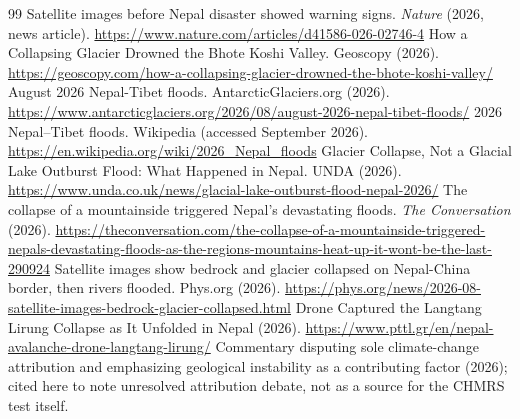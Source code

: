 \documentclass[11pt,twocolumn]{article}
\begin{document}
\begin{thebibliography}{99}
 Satellite images before Nepal disaster showed warning signs. \textit{Nature} (2026, news article). \url{https://www.nature.com/articles/d41586-026-02746-4}
 How a Collapsing Glacier Drowned the Bhote Koshi Valley. Geoscopy (2026). \url{https://geoscopy.com/how-a-collapsing-glacier-drowned-the-bhote-koshi-valley/}
 August 2026 Nepal-Tibet floods. AntarcticGlaciers.org (2026). \url{https://www.antarcticglaciers.org/2026/08/august-2026-nepal-tibet-floods/}
 2026 Nepal--Tibet floods. Wikipedia (accessed September 2026). \url{https://en.wikipedia.org/wiki/2026_Nepal_floods}
 Glacier Collapse, Not a Glacial Lake Outburst Flood: What Happened in Nepal. UNDA (2026). \url{https://www.unda.co.uk/news/glacial-lake-outburst-flood-nepal-2026/}
 The collapse of a mountainside triggered Nepal's devastating floods. \textit{The Conversation} (2026). \url{https://theconversation.com/the-collapse-of-a-mountainside-triggered-nepals-devastating-floods-as-the-regions-mountains-heat-up-it-wont-be-the-last-290924}
 Satellite images show bedrock and glacier collapsed on Nepal-China border, then rivers flooded. Phys.org (2026). \url{https://phys.org/news/2026-08-satellite-images-bedrock-glacier-collapsed.html}
 Drone Captured the Langtang Lirung Collapse as It Unfolded in Nepal (2026). \url{https://www.pttl.gr/en/nepal-avalanche-drone-langtang-lirung/}
 Commentary disputing sole climate-change attribution and emphasizing geological instability as a contributing factor (2026); cited here to note unresolved attribution debate, not as a source for the CHMRS test itself.
\end{thebibliography}
\end{document}
